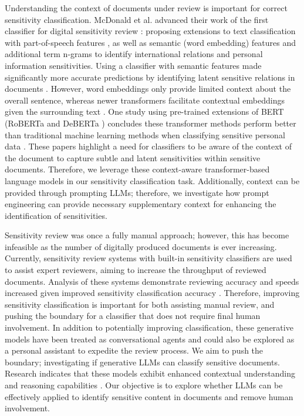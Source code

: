 Understanding the context of documents under review is important for correct sensitivity classification. McDonald et al. advanced their work of the first classifier for digital sensitivity review \cite{mcdonald2014towards}: proposing extensions to text classification with part-of-speech features \cite{mcdonald2015using}, as well as semantic (word embedding) features and additional term n-grams \cite{mcdonald2017enhancing} to identify international relations and personal information sensitivities. Using a classifier with semantic features made significantly more accurate predictions by identifying latent sensitive relations in documents \cite{mcdonald2017enhancing}. However, word embeddings only provide limited context about the overall sentence, whereas newer transformers facilitate contextual embeddings given the surrounding text \cite{noh2021improved}. One study using pre-trained extensions of BERT \cite{devlin2018bert} (RoBERTa \cite{liu2019roberta} and DeBERTa \cite{he2020deberta}) concludes these transformer methods perform better than traditional machine learning methods when classifying sensitive personal data \cite{gambarelli2023your}. These papers highlight a need for classifiers to be aware of the context of the document to capture subtle and latent sensitivities within sensitive documents. Therefore, we leverage these context-aware transformer-based language models in our sensitivity classification task. Additionally, context can be provided through prompting LLMs; therefore, we investigate how prompt engineering can provide necessary supplementary context for enhancing the identification of sensitivities.

Sensitivity review was once a fully manual approach; however, this has become infeasible as the number of digitally produced documents is ever increasing. Currently, sensitivity review systems with built-in sensitivity classifiers are used to assist expert reviewers, aiming to increase the throughput of reviewed documents. Analysis of these systems demonstrate reviewing accuracy and speeds increased given improved sensitivity classification accuracy \cite{mcdonald2020accuracy}. Therefore, improving sensitivity classification is important for both assisting manual review, and pushing the boundary for a classifier that does not require final human involvement. In addition to potentially improving classification, these generative models have been treated as conversational agents \cite{pereira2023here} and could also be explored as a personal assistant to expedite the review process. We aim to push the boundary; investigating if generative LLMs can classify sensitive documents. Research indicates that these models exhibit enhanced contextual understanding and reasoning capabilities \cite{adiwardana2020towards}. Our objective is to explore whether LLMs can be effectively applied to identify sensitive content in documents and remove human involvement.

